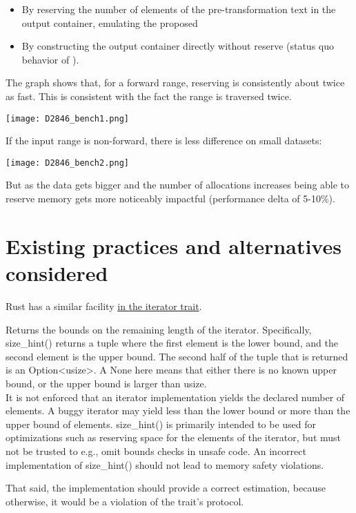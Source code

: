 \documentclass{wg21}
\begin{document}
\begin{itemize}
\item By reserving the number of elements of the pre-transformation text in the output container, emulating the proposed 
\item By constructing the output container directly without reserve (status quo behavior of ).
\end{itemize}

The graph shows that, for a forward range, reserving is consistently about twice as fast. This is consistent with the fact the range is traversed twice.

\texttt{[image: D2846\_bench1.png]}

If the input range is non-forward, there is less difference on small datasets:

\texttt{[image: D2846\_bench2.png]}

But as the data gets bigger and the number of allocations increases being able to reserve memory gets more noticeably impactful (performance delta of 5-10\%).

\section{Existing practices and alternatives considered}

Rust has a similar facility \href{https://doc.rust-lang.org/std/iter/trait.Iterator.html#method.size_hint}{in the iterator trait}.

\begin{quoteblock}
\textbf{}


Returns the bounds on the remaining length of the iterator.
Specifically, size_hint() returns a tuple where the first element is the lower bound, and the second element is the upper bound.
The second half of the tuple that is returned is an Option<usize>. A None here means that either there is no known upper bound, or the upper bound is larger than usize.\\

It is not enforced that an iterator implementation yields the declared number of elements. A buggy iterator may yield less than the lower bound or more than the upper bound of elements.
size_hint() is primarily intended to be used for optimizations such as reserving space for the elements of the iterator, but must not be trusted to e.g., omit bounds checks in unsafe code. An incorrect implementation of size_hint() should not lead to memory safety violations.

That said, the implementation should provide a correct estimation, because otherwise, it would be a violation of the trait’s protocol.
\end{quoteblock}
\end{document}
